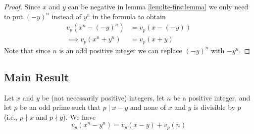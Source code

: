     \begin{proof}
        Since $x$ and $y$ can be negative in lemma \eqref{lem:lte-firstlemma} we only need to put $(-y)^n$ instead of $y^n$ in the formula to obtain
	         \begin{align*}
		         v_p\left( x^n - (-y)^n \right)
		         	& = v_p ( x - (-y))\\
		         \implies v_p\left(x^n + y^n\right)
		         	& = v_p(x+y)
	         \end{align*}
        Note that since $n$ is an odd positive integer we can replace $(-y)^n$ with $-y^n$.
    \end{proof}

\subsection{Main Result}

    \begin{theorem}\label{theorem1}
        Let $ x$ and $y$ be (not necessarily positive) integers, let $n$ be a positive integer, and let $p$ be an odd prime such that $ p \mid x - y$ and none of
        $x$ and $y$ is divisible by $p$ (i.e., $p \nmid x$ and $p \nmid y$).  We have
        \[ v_p(  x^n - y^n ) = v_p(  x - y ) + v_p  (n )\]
    \end{theorem}


